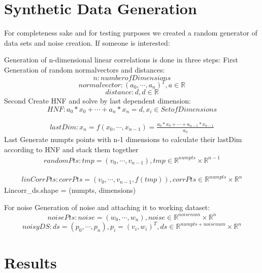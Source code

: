 \chapter{Synthetic Data Generation}
\label{sec:datagen}
For completeness sake and for testing purposes we created a random generator of data sets and noise creation.
If someone is interested:

Generation of n-dimensional linear correlations is done in three steps:
First Generation of random normalvectors and distances: 
$$ n: number of Dimensions$$
$$normalvector: (a_0, \cdots, a_n )^T, a \in \mathbb{R}$$
$$distance: d, d \in \mathbb{R}$$
Second Create HNF and solve by last dependent dimension:
$$HNF: a_0 * x_0 + \cdots + a_n * x_n = d, x_i \in Set of Dimensions$$

\begin{align}
    last Dim: x_n = f(x_0, \cdots, x_{n-1}) = \frac{a_0 * x_0 + \cdots + a_{n-1} * x_{n-1}}{a_n}
\end{align}
Last Generate numpts points with n-1 dimensions to calculate their lastDim according to HNF and stack them together
\begin{align}
    randomPts: tmp = (v_0, \cdots, v_{n-1}), tmp \in \mathbb{R}^{numpts} \times \mathbb{R}^{n-1}
    \end{align}
    
\begin{align}
    linCorrPts: corrPts =  (v_0, \cdots, v_{n-1}, f(tmp)), corrPts \in \mathbb{R}^{numpts} \times \mathbb{R}^{n}
\end{align}
Lincorr\_ds.shape = (numpts, dimensions)

For noise Generation of noise and attaching it to working dataset:
$$noisePts: noise = (w_0, \cdots, w_n), noise \in \mathbb{R}^{noisenum} \times \mathbb{R}^{n}$$
$$noisyDS: ds = (p_0, \cdots, p_n), p_i = (v_i, w_i)^T, ds \in \mathbb{R}^{numpts+noisenum} \times \mathbb{R}^n$$

\chapter{Results}